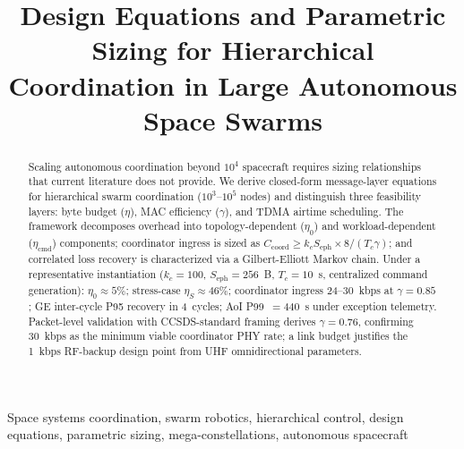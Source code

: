 \documentclass[journal]{IEEEtran}
\begin{document}
\title{Design Equations and Parametric Sizing for Hierarchical Coordination in Large Autonomous Space Swarms}

\author{
}


\maketitle

\begin{abstract}
Scaling autonomous coordination beyond $10^4$ spacecraft requires sizing relationships that current literature does not provide. We derive closed-form message-layer equations for hierarchical swarm coordination ($10^3$--$10^5$ nodes) and distinguish three feasibility layers: byte budget ($\eta$), MAC efficiency ($\gamma$), and TDMA airtime scheduling. The framework decomposes overhead into topology-dependent ($\eta_0$) and workload-dependent ($\eta_{\text{cmd}}$) components; coordinator ingress is sized as $C_{\text{coord}} \geq k_c S_{\text{eph}} \times 8 / (T_c \gamma)$; and correlated loss recovery is characterized via a Gilbert-Elliott Markov chain. Under a representative instantiation ($k_c = 100$, $S_{\text{eph}} = 256$~B, $T_c = 10$~s, centralized command generation): $\eta_0 \approx 5\%$; stress-case $\eta_S \approx 46\%$; coordinator ingress 24--30~kbps at $\gamma = 0.85$; GE inter-cycle P95 recovery in 4~cycles; AoI P99~$= 440$~s under exception telemetry. Packet-level validation with CCSDS-standard framing derives $\gamma = 0.76$, confirming 30~kbps as the minimum viable coordinator PHY rate; a link budget justifies the 1~kbps RF-backup design point from UHF omnidirectional parameters.
\end{abstract}

\begin{IEEEkeywords}
Space systems coordination, swarm robotics, hierarchical control, design equations, parametric sizing, mega-constellations, autonomous spacecraft
\end{IEEEkeywords}

\end{document}
